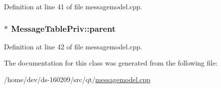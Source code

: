 Definition at line 41 of file messagemodel.\+cpp.

\hypertarget{class_message_table_priv_a74b87dfad5028d83a91cbde919b9c908}{}
\subsubsection[{parent}]{$\ast$ Message\+Table\+Priv\+::parent}\label{class_message_table_priv_a74b87dfad5028d83a91cbde919b9c908}


Definition at line 42 of file messagemodel.\+cpp.



The documentation for this class was generated from the following file\+:\begin{DoxyCompactItemize}
\item 
/home/dev/ds-\/160209/src/qt/\hyperlink{messagemodel_8cpp}{messagemodel.\+cpp}\end{DoxyCompactItemize}
